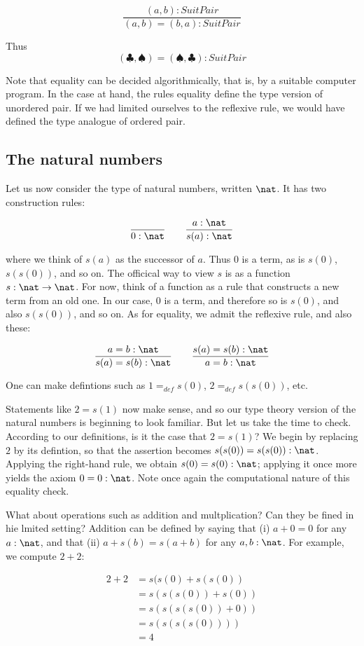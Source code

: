 $$
\frac{(a,b) : SuitPair }{(a,b) = (b,a) : SuitPair}
$$

Thus 
$$(\clubsuit, \spadesuit) = (\spadesuit, \clubsuit) : SuitPair
$$

Note that equality can be decided algorithmically, that is, by a suitable computer program.  In the case at hand, the rules equality define the type version of unordered pair.  If we had limited ourselves to the reflexive rule, we would have defined the type analogue of ordered pair.  

\subsection{The natural numbers}


Let us now consider the type of natural numbers, written $\nat$.  It has two construction rules:

$$
\frac{}{0 : \nat} \qquad \frac{a : \nat}{s(a) : \nat}
$$

where we think of $s(a)$ as the successor of $a$.  Thus $0$ is a term, as is $s(0)$, $s(s(0))$, and so on.  The officical way to view $s$ is as a function $s : \nat \to \nat$.  For now, think of a function as a rule that constructs a new term from an old one.  In our case, $0$ is a term, and therefore so is $s(0)$, and also $s(s(0))$, and so on.  As for equality, we admit the reflexive rule, and also these:

$$
\frac{a = b : \nat}{s(a)  = s(b) : \nat}
\qquad 
\frac{s(a)  = s(b) : \nat}{a = b : \nat}
$$

One can make defintions such as $1 =_{def}  s(0)$, $2 =_{def}  s(s(0))$, etc.  

Statements like $2 = s(1)$ now make sense, and so our type theory version of the natural numbers is beginning to look familiar.   But let us take the time to check.  According to our definitions, is it the case that $2 = s(1)$?  We begin by replacing $2$ by its defintion, so that the assertion becomes $s(s(0)) = s(s(0)): \nat$.  Applying the right-hand rule, we obtain $s(0) = s(0): \nat$; applying it once more yields the axiom $0 = 0 : \nat$. Note once again the computational nature of this equality check.


What about operations such as addition and multplication?  Can they be fined in hie lmited setting?
Addition can be defined by saying that (i) $a + 0 = 0$ for any $a:\nat$, and that (ii) $a + s(b) = s(a + b)$ for any $a,b:\nat$.  For example, we compute $2 + 2$:

\begin{align}
2 + 2 &= s(s(0) + s(s(0))\\
  &= s(s(s(0)) + s(0)) \\
  &= s(s(s(s(0)) + 0)) \\
  &= s(s(s(s(0)))) \\
  &= 4
\end{align}


